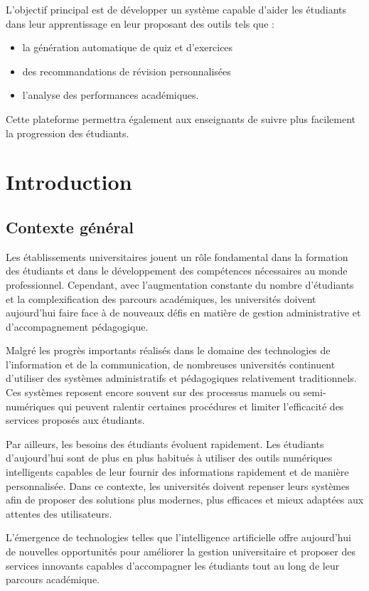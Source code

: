 \documentclass[12pt,a4paper]{report}
\begin{document}
L'objectif principal est de développer un système capable d'aider les étudiants dans leur apprentissage en leur proposant des outils tels que :
\begin{itemize}
    \item la génération automatique de quiz et d'exercices
    \item des recommandations de révision personnalisées
    \item l'analyse des performances académiques.
\end{itemize}
Cette plateforme permettra également aux enseignants de suivre plus facilement la progression des étudiants.

\tableofcontents

\chapter{Introduction}
\section{Contexte général}
Les établissements universitaires jouent un rôle fondamental dans la formation des étudiants et dans le développement des compétences nécessaires au monde professionnel. Cependant, avec l'augmentation constante du nombre d'étudiants et la complexification des parcours académiques, les universités doivent aujourd'hui faire face à de nouveaux défis en matière de gestion administrative et d'accompagnement pédagogique.

Malgré les progrès importants réalisés dans le domaine des technologies de l'information et de la communication, de nombreuses universités continuent d'utiliser des systèmes administratifs et pédagogiques relativement traditionnels. Ces systèmes reposent encore souvent sur des processus manuels ou semi-numériques qui peuvent ralentir certaines procédures et limiter l'efficacité des services proposés aux étudiants.

Par ailleurs, les besoins des étudiants évoluent rapidement. Les étudiants d'aujourd'hui sont de plus en plus habitués à utiliser des outils numériques intelligents capables de leur fournir des informations rapidement et de manière personnalisée. Dans ce contexte, les universités doivent repenser leurs systèmes afin de proposer des solutions plus modernes, plus efficaces et mieux adaptées aux attentes des utilisateurs.

L'émergence de technologies telles que l'intelligence artificielle offre aujourd'hui de nouvelles opportunités pour améliorer la gestion universitaire et proposer des services innovants capables d'accompagner les étudiants tout au long de leur parcours académique.
\end{document}

